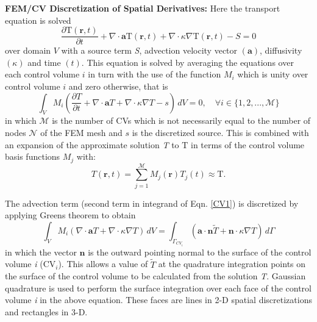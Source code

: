 \noindent
\textbf{FEM/CV Discretization of Spatial Derivatives: } Here the transport equation is solved
\begin{equation}
\displaystyle\frac{\partial \text{T}(\mathbf{r},t) }{\partial t} + \nabla\cdot \textbf{a}
\text{T}(\mathbf{r},t) +\nabla\cdot \kappa \nabla \text{T}(\mathbf{r},t)  - S = 0
\label{traneq}
\end{equation}
over domain $V$ with a source term \textit{S}, advection velocity vector $\left(\mathbf{a}\right)$, diffusivity $\left(\kappa\right)$ and time $\left(\textit{t}\right)$.  This equation is solved by averaging the equations over each control volume $i$ in turn with the use of the function $M_{i}$ which is unity over control volume $i$ and zero otherwise, that is
\begin{equation}
\int_{V} M_{i} \left( \frac{\partial T }{\partial t} +
\nabla\cdot \textbf{a} T +\nabla\cdot \kappa \nabla T - s \right)\,d V
= 0, \quad \forall i \in \{1,2,..., \mathcal{M}\}
\label{CV1}
\end {equation}
\noindent
in which $\mathcal{M}$ is the number of CVs which is not necessarily equal to the number of nodes $\mathcal{N}$ of the FEM mesh and $s$ is the discretized source. This is combined with an expansion of the approximate solution \textit{T} to $\text{T}$ in terms of the control volume basis functions $M_{j}$ with:
\begin{equation}
T\left(\mathbf{r},t\right)=\sum\limits_{j=1}^{\mathcal{M}} M_{j}\left(\mathbf{r}\right) T_{j}(t) \approx \text{T}.
\end{equation}

The advection term (second term in integrand of Eqn. \ref{CV1}) is discretized by applying Greens theorem to obtain
\begin{equation}
\int_{V} M_{i} \left( \nabla \cdot \mathbf{a} T+\nabla\cdot \kappa \nabla T \right)\,d V = \int_{\Gamma_{CV_i}} \left(\mathbf{a}\cdot \mathbf{n}\widetilde{T}+\mathbf{n}\cdot \kappa \nabla T \right) \,d \Gamma
\label{a}
\end{equation}
\noindent
in which the vector $\mathbf{n}$ is the outward pointing normal to the surface of the control volume \textit{i} (CV$_{i}$).  This allows a value of $\widetilde{T}$ at the quadrature integration points on the surface of the control volume to be calculated from the solution \textit{T}. Gaussian quadrature is used to perform the surface integration over each face of the control volume \textit{i} in the above equation.  These faces are lines in 2-D spatial discretizations and rectangles in 3-D.

